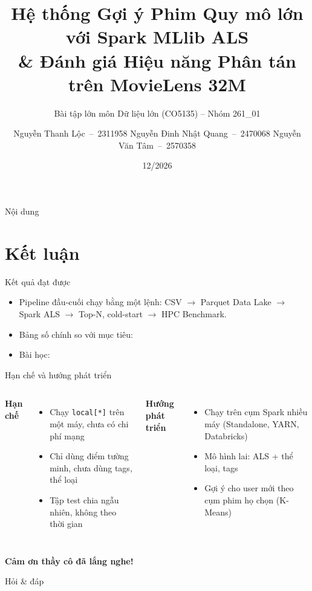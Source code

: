 \documentclass[aspectratio=169,11pt]{beamer}
\title[Gợi ý phim với Spark ALS]{Hệ thống Gợi ý Phim Quy mô lớn với Spark MLlib ALS\\
  \& Đánh giá Hiệu năng Phân tán trên MovieLens 32M}
\subtitle{Bài tập lớn môn Dữ liệu lớn (CO5135) -- Nhóm 261\_01}
\author[N. T. Lộc, N. Đ. N. Quang, N. V. Tâm]{%
  Nguyễn Thanh Lộc \,--\, 2311958 \quad
  Nguyễn Đinh Nhật Quang \,--\, 2470068 \quad
  Nguyễn Văn Tâm \,--\, 2570358}
\institute[HCMUT]{%
  Khoa Khoa học và Kỹ thuật Máy tính\\
  Trường Đại học Bách khoa \,--\, ĐHQG TP.HCM}
\date{12/2026}
\begin{document}
\begin{frame}[plain]
  \titlepage
\end{frame}

\begin{frame}{Nội dung}
  \tableofcontents
\end{frame}





\section{Kết luận}

\begin{frame}{Kết quả đạt được}
  \begin{itemize}
    \item Pipeline đầu-cuối chạy bằng một lệnh: CSV $\rightarrow$ Parquet Data Lake $\rightarrow$
      Spark ALS $\rightarrow$ Top-N, cold-start $\rightarrow$ HPC Benchmark.
    \item Bảng số chính so với mục tiêu: 
    \item Bài học: 
  \end{itemize}
\end{frame}

\begin{frame}{Hạn chế và hướng phát triển}
  \begin{columns}[T]
    \textbf{Hạn chế}
    \begin{itemize}
      \item Chạy \texttt{local[*]} trên một máy, chưa có chi phí mạng
      \item Chỉ dùng điểm tường minh, chưa dùng tags, thể loại
      \item Tập test chia ngẫu nhiên, không theo thời gian
    \end{itemize}
    \textbf{Hướng phát triển}
    \begin{itemize}
      \item Chạy trên cụm Spark nhiều máy (Standalone, YARN, Databricks)
      \item Mô hình lai: ALS + thể loại, tags
      \item Gợi ý cho user mới theo cụm phim họ chọn (K-Means)
    \end{itemize}
  \end{columns}
\end{frame}

\begin{frame}[plain]
  \centering\vfill
  {\Huge\bfseries Cảm ơn thầy cô đã lắng nghe!\par}
  \bigskip
  {\Large Hỏi \& đáp\par}
  \vfill
\end{frame}
\end{document}
